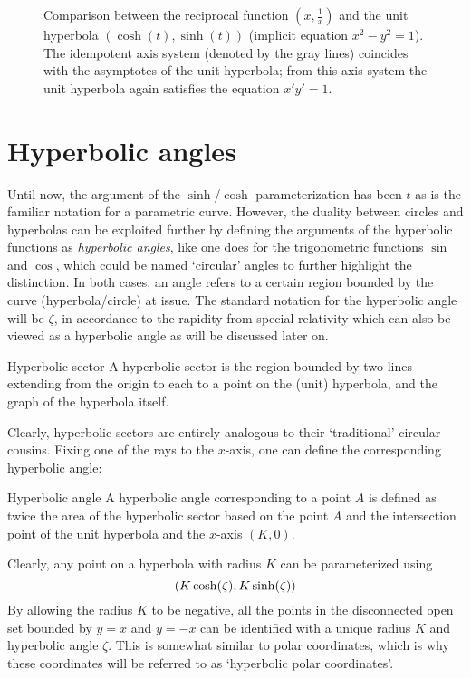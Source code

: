 \begin{figure}[ht]
    \centering
    
    \caption{Comparison between the reciprocal function \((x, \tfrac{1}{x})\) and the unit hyperbola \((\cosh(t), \sinh(t))\) (implicit equation \(x^2 - y^2 = 1\)). The idempotent axis system (denoted by the gray lines) coincides with the asymptotes of the unit hyperbola; from this axis system the unit hyperbola again satisfies the equation \(x' y' = 1\).}
    \label{fig:hyperbola_comparison}
\end{figure}

\section{Hyperbolic angles}
Until now, the argument of the \(\sinh\)/\(\cosh\) parameterization has been \(t\) as is the familiar notation for a parametric curve. However, the duality between circles and hyperbolas can be exploited further by defining the arguments of the hyperbolic functions as \emph{hyperbolic angles}, like one does for the trigonometric functions \(\sin\) and \(\cos\), which could be named `circular' angles to further highlight the distinction. In both cases, an angle refers to a certain region bounded by the curve (hyperbola/circle) at issue. The standard notation for the hyperbolic angle will be \(\zeta\), in accordance to the rapidity from special relativity which can also be viewed as a hyperbolic angle as will be discussed later on. 
\begin{block}{Hyperbolic sector}
A hyperbolic sector is the region bounded by two lines extending from the origin to each to a point on the (unit) hyperbola, and the graph of the hyperbola itself. 
\end{block}
Clearly, hyperbolic sectors are entirely analogous to their `traditional' circular cousins. Fixing one of the rays to the \(x\)-axis, one can define the corresponding hyperbolic angle:
\begin{block}{Hyperbolic angle}
A hyperbolic angle corresponding to a point \(A\) is defined as twice the area of the hyperbolic sector based on the point \(A\) and the intersection point of the unit hyperbola and the \(x\)-axis \((K, 0)\).
\end{block}
Clearly, any point on a hyperbola with radius \(K\) can be parameterized using \[
     \qty(K\cosh(\zeta), K\sinh(\zeta))
\] By allowing the radius \(K\) to be negative, all the points in the disconnected open set bounded by \(y = x\) and \(y = -x\) can be identified with a unique radius \(K\) and hyperbolic angle \(\zeta\). This is somewhat similar to polar coordinates, which is why these coordinates will be referred to as `hyperbolic polar coordinates'.

